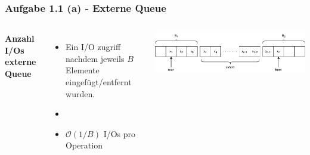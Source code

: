 \documentclass[aspectratio=169]{beamer}
\begin{document}
\begin{frame}
\frametitle{Aufgabe 1.1 (a) - Externe Queue}
\begin{columns}[c] %
	
	\textbf{Anzahl I/Os externe Queue}
	\begin{itemize}
		\item Ein I/O zugriff nachdem jeweils $B$ Elemente eingefügt/entfernt wurden.
		\item[]
		\item \textbf{$\mathcal{O}(1/B)$} I/Os pro Operation
	\end{itemize}
	
	\includegraphics[scale=.5]{queue1.pdf}
	
\end{columns}
\end{frame}
\end{document}
